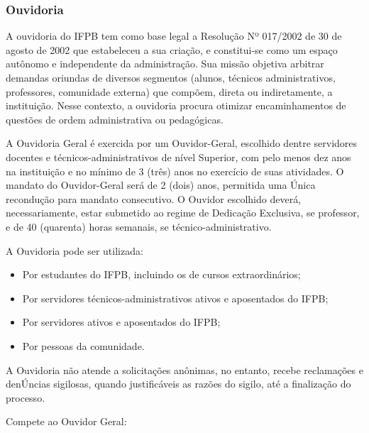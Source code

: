 \subsubsection{Ouvidoria}
       
A ouvidoria do IFPB tem como base legal a Resolução Nº 017/2002 de 30 de agosto de 2002 que estabeleceu a sua criação, e constitui-se como um espaço autônomo e independente da administração.  Sua missão objetiva arbitrar demandas oriundas de diversos segmentos (alunos, técnicos administrativos, professores, comunidade externa) que compõem, direta ou indiretamente, a instituição. Nesse contexto, a ouvidoria procura otimizar encaminhamentos de questões de ordem administrativa ou pedagógicas. 

A Ouvidoria Geral é exercida por um Ouvidor-Geral, escolhido dentre servidores docentes e técnicos-administrativos de nível Superior, com pelo menos dez anos na instituição e no mínimo de 3 (três) anos no exercício de suas atividades. O mandato do Ouvidor-Geral será de 2 (dois) anos, permitida uma Única recondução para mandato consecutivo. O Ouvidor escolhido deverá, necessariamente, estar submetido ao regime de Dedicação Exclusiva, se professor, e de 40 (quarenta) horas semanais, se técnico-administrativo.

                 A Ouvidoria pode ser utilizada:

\begin{itemize}
\item Por estudantes do IFPB, incluindo os de cursos extraordinários;

\item Por servidores técnicos-administrativos ativos e aposentados do IFPB;

\item Por servidores ativos e aposentados do IFPB;

\item Por pessoas da comunidade.
\end{itemize}

	A Ouvidoria não atende a solicitações anônimas, no entanto, recebe reclamações e denÚncias sigilosas, quando justificáveis as razões do sigilo, até a finalização do processo.

          Compete ao Ouvidor Geral:

